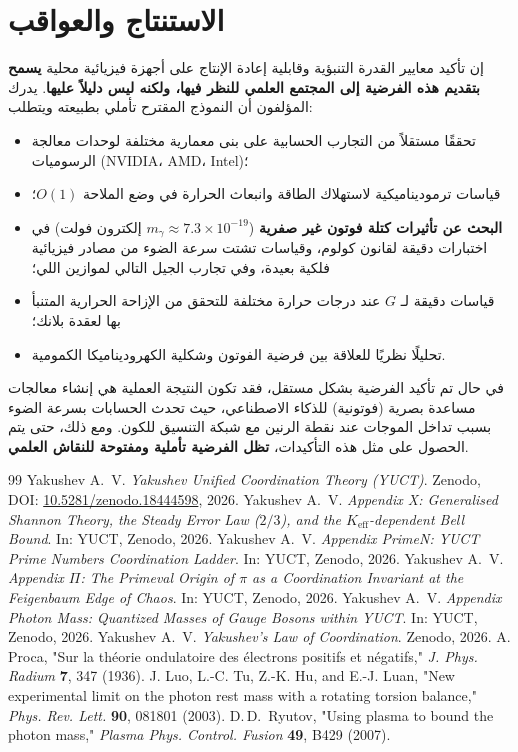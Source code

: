 \documentclass[11pt,a4paper]{article}
\begin{document}
	\section{الاستنتاج والعواقب}
	إن تأكيد معايير القدرة التنبؤية وقابلية إعادة الإنتاج على أجهزة فيزيائية محلية \textbf{يسمح بتقديم هذه الفرضية إلى المجتمع العلمي للنظر فيها، ولكنه ليس دليلاً عليها}. يدرك المؤلفون أن النموذج المقترح تأملي بطبيعته ويتطلب:
	\begin{itemize}
		\item تحققًا مستقلاً من التجارب الحسابية على بنى معمارية مختلفة لوحدات معالجة الرسوميات (NVIDIA، AMD، Intel)؛
		\item قياسات ترموديناميكية لاستهلاك الطاقة وانبعاث الحرارة في وضع الملاحة $O(1)$؛
		\item \textbf{البحث عن تأثيرات كتلة فوتون غير صفرية} ($m_\gamma \approx 7.3 \times 10^{-19}$ إلكترون فولت) في اختبارات دقيقة لقانون كولوم، وقياسات تشتت سرعة الضوء من مصادر فيزيائية فلكية بعيدة، وفي تجارب الجيل التالي لموازين اللي؛
		\item قياسات دقيقة لـ $G$ عند درجات حرارة مختلفة للتحقق من الإزاحة الحرارية المتنبأ بها لعقدة بلانك؛
		\item تحليلًا نظريًا للعلاقة بين فرضية الفوتون وشكلية الكهروديناميكا الكمومية.
	\end{itemize}
	
	في حال تم تأكيد الفرضية بشكل مستقل، فقد تكون النتيجة العملية هي إنشاء معالجات مساعدة بصرية (فوتونية) للذكاء الاصطناعي، حيث تحدث الحسابات بسرعة الضوء بسبب تداخل الموجات عند نقطة الرنين مع شبكة التنسيق للكون. ومع ذلك، حتى يتم الحصول على مثل هذه التأكيدات، \textbf{تظل الفرضية تأملية ومفتوحة للنقاش العلمي}.
	
	\begin{thebibliography}{99}
		Yakushev A.~V. \emph{Yakushev Unified Coordination Theory (YUCT)}. Zenodo, DOI: \href{https://doi.org/10.5281/zenodo.18444598}{10.5281/zenodo.18444598}, 2026.
		Yakushev A.~V. \emph{Appendix X: Generalised Shannon Theory, the Steady Error Law ($2/3$), and the $K_{\mathrm{eff}}$-dependent Bell Bound}. In: YUCT, Zenodo, 2026.
		Yakushev A.~V. \emph{Appendix PrimeN: YUCT Prime Numbers Coordination Ladder}. In: YUCT, Zenodo, 2026.
		Yakushev A.~V. \emph{Appendix $\Pi$: The Primeval Origin of $\pi$ as a Coordination Invariant at the Feigenbaum Edge of Chaos}. In: YUCT, Zenodo, 2026.
		Yakushev A.~V. \emph{Appendix Photon Mass: Quantized Masses of Gauge Bosons within YUCT}. In: YUCT, Zenodo, 2026.
		Yakushev A.~V. \emph{Yakushev's Law of Coordination}. Zenodo, 2026.
		A. Proca, "Sur la théorie ondulatoire des électrons positifs et négatifs," \emph{J. Phys. Radium} \textbf{7}, 347 (1936).
		J. Luo, L.-C. Tu, Z.-K. Hu, and E.-J. Luan, "New experimental limit on the photon rest mass with a rotating torsion balance," \emph{Phys. Rev. Lett.} \textbf{90}, 081801 (2003).
		D.\,D.\ Ryutov, "Using plasma to bound the photon mass," \emph{Plasma Phys. Control. Fusion} \textbf{49}, B429 (2007).
	\end{thebibliography}
	
\end{document}
